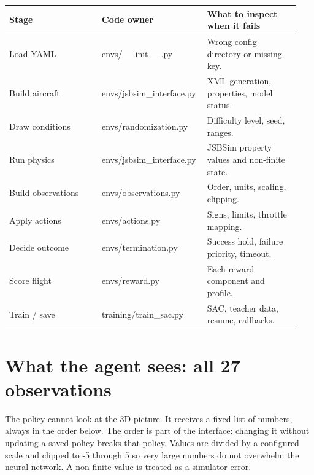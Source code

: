 \documentclass[11pt,a4paper]{article}
\begin{document}
\begin{longtable}{|p{0.313\linewidth}|p{0.313\linewidth}|p{0.313\linewidth}|}\hline
Stage & Code owner & What to inspect when it fails \\ \hline
Load YAML & envs/\_\_init\_\_.py & Wrong config directory or missing key. \\ \hline
Build aircraft & envs/jsbsim\_interface.py & XML generation, properties, model status. \\ \hline
Draw conditions & envs/randomization.py & Difficulty level, seed, ranges. \\ \hline
Run physics & envs/jsbsim\_interface.py & JSBSim property values and non-finite state. \\ \hline
Build observations & envs/observations.py & Order, units, scaling, clipping. \\ \hline
Apply actions & envs/actions.py & Signs, limits, throttle mapping. \\ \hline
Decide outcome & envs/termination.py & Success hold, failure priority, timeout. \\ \hline
Score flight & envs/reward.py & Each reward component and profile. \\ \hline
Train / save & training/train\_sac.py & SAC, teacher data, resume, callbacks. \\ \hline
\end{longtable}
\section{What the agent sees: all 27 observations}
The policy cannot look at the 3D picture. It receives a fixed list of numbers, always in the order below. The order is part of the interface: changing it without updating a saved policy breaks that policy. Values are divided by a configured scale and clipped to -5 through 5 so very large numbers do not overwhelm the neural network. A non-finite value is treated as a simulator error.
\end{document}

